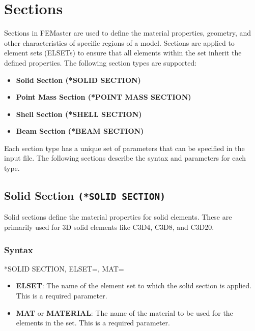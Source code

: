 
\chapter{Sections}
\label{chap:sections}

Sections in FEMaster are used to define the material properties, geometry, and other characteristics of specific regions of a model. Sections are applied to element sets (ELSETs) to ensure that all elements within the set inherit the defined properties. The following section types are supported:

\begin{itemize}
\item \textbf{Solid Section (*SOLID SECTION)}
\item \textbf{Point Mass Section (*POINT MASS SECTION)}
\item \textbf{Shell Section (*SHELL SECTION)}
\item \textbf{Beam Section (*BEAM SECTION)}
\end{itemize}

Each section type has a unique set of parameters that can be specified in the input file. The following sections describe the syntax and parameters for each type.


\section{Solid Section \texttt{(*SOLID SECTION)}}
Solid sections define the material properties for solid elements. These are primarily used for 3D solid elements like C3D4, C3D8, and C3D20.

\subsection{Syntax}
\begin{codeBlock}
*SOLID SECTION, ELSET=, MAT=
\end{codeBlock}

\begin{itemize}
\item \textbf{ELSET}: The name of the element set to which the solid section is applied. This is a required parameter.
\item \textbf{MAT} or \textbf{MATERIAL}: The name of the material to be used for the elements in the set. This is a required parameter.
\end{itemize}

